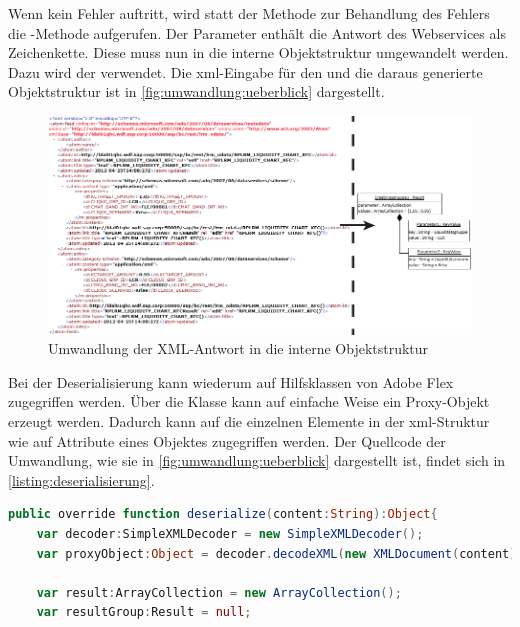 \begin{onehalfspacing}
Wenn kein Fehler auftritt, wird statt der Methode zur Behandlung des Fehlers die -Methode aufgerufen. Der Parameter  enthält die Antwort des Webservices als Zeichenkette. Diese muss nun in die interne Objektstruktur umgewandelt werden. Dazu wird der  verwendet. Die \gls{xml}-Eingabe für den  und die daraus generierte Objektstruktur ist in \vref{fig:umwandlung:ueberblick} dargestellt.

\begin{figure}[ht]
\centering
\setlength{\unitlength}{1mm}
\includegraphics[width=15cm]{images/Abbildung21-Umwandlung.pdf}
\caption{Umwandlung der XML-Antwort in die interne Objektstruktur\label{fig:umwandlung:ueberblick}}
\end{figure}

Bei der Deserialisierung kann wiederum auf Hilfsklassen von Adobe Flex zugegriffen werden. Über die Klasse  kann auf einfache Weise ein Proxy-Objekt erzeugt werden. Dadurch kann auf die einzelnen Elemente in der \gls{xml}-Struktur wie auf Attribute eines Objektes zugegriffen werden. Der Quellcode der Umwandlung, wie sie in \vref{fig:umwandlung:ueberblick} dargestellt ist, findet sich in \vref{listing:deserialisierung}.


\begin{programm}[ht]
\begin{lstlisting}[language=ActionScript]
public override function deserialize(content:String):Object{			
	var decoder:SimpleXMLDecoder = new SimpleXMLDecoder();
	var proxyObject:Object = decoder.decodeXML(new XMLDocument(content));
	
	var result:ArrayCollection = new ArrayCollection();
	var resultGroup:Result = null;			
			

\end{lstlisting}
\end{programm}
\end{onehalfspacing}
